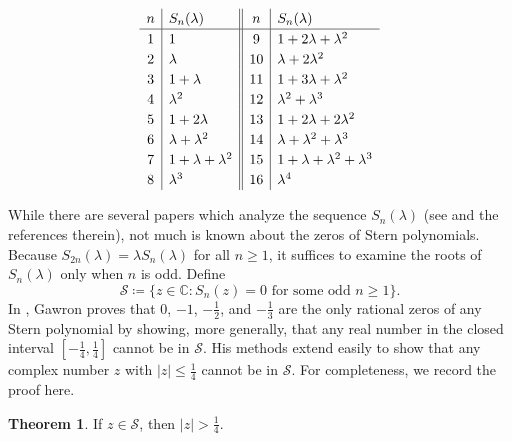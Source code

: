 \documentclass[11pt]{article}
\theoremstyle{definition}
\newtheorem{thm}{Theorem}
\newcommand{\stern}[2]{S_{#1}(#2)}
\newcommand{\lm}{\lambda}
\newcommand{\C}{\mathbb C}
\newcommand{\calS}{\mathcal S}
\begin{document}
\begin{table}[ht]
\[
\def\arraystretch{1.2}
\begin{array}{c|l||c|l}
	n & \stern n\lambda & n & \stern n\lambda  \\ \hline
	1 & 1 & 9 & 1 + 2\lambda + \lambda^2 \\
	2 & \lambda  & 10 & \lambda + 2 \lambda ^2  \\
	3 & 1+\lambda & 11 & 1 + 3\lambda + \lambda ^2 \\
	4 & \lambda ^2 & 12 & \lambda ^2 + \lambda ^3 \\
	5 & 1+ 2 \lambda  & 13 & 1 + 2\lambda + 2 \lambda ^2 \\
	6 & \lambda+\lambda^2  & 14 & \lambda+\lambda ^2+\lambda^3  \\
	7 & 1 + \lambda+\lambda^2 & 15 & 1 + \lambda +\lambda ^2+\lambda^3 \\
	8 & \lambda ^3 & 16 & \lambda ^4 \\
\end{array}
\]
	\caption{\small The first $16$ terms of the sequence $\stern n\lm$.}
	\label{table:stern-16}
\end{table}

While there are several papers which analyze the sequence $\stern n\lm$ (see \cite{Dilcher2017,Dilcher2018,Gawron2014,Ulas2011} and the references therein), not much is known about the zeros of Stern polynomials.  Because $\stern{2n}\lm = \lm \stern n \lm$ for all $n\geq 1$, it suffices to examine the roots of $\stern n\lm$ only when $n$ is odd.  Define
\[
\calS\coloneqq \{z\in\C: \stern n z = 0\text{ for some odd }n\geq 1\}.
\]
In \cite[Theorem 2.1]{Gawron2014}, Gawron proves that $0$, ${-}1$, ${-}\tfrac12$, and $-\tfrac13$ are the only rational zeros of any Stern polynomial by showing, more generally, that any real number in the closed interval $[-\tfrac14,\tfrac14]$ cannot be in $\calS$.  His methods extend easily to show that any complex number $z$ with $|z| \leq \tfrac14$ cannot be in $\calS$.  For completeness, we record the proof here.

\begin{thm}\label{thm:gawron-generalization}
	If $z\in \calS$, then $|z| > \tfrac 14$.
\end{thm}
\end{document}
